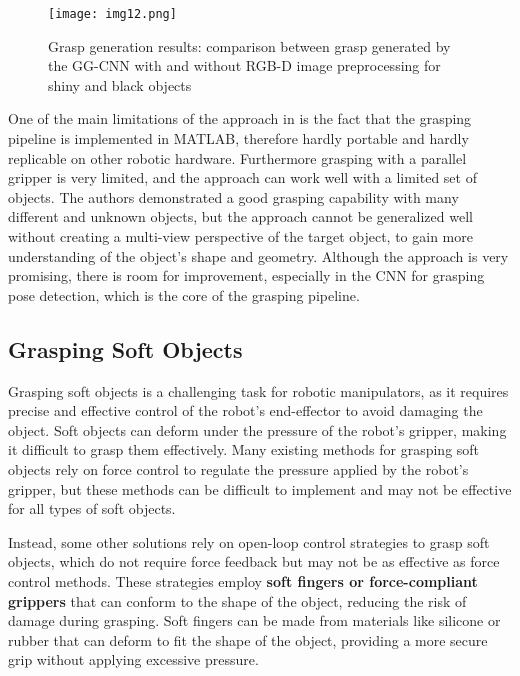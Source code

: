 \begin{figure}[t]
	\centering
	\texttt{[image: img12.png]}
	\captionsetup{width=1\linewidth}
	\caption{Grasp generation results: comparison between grasp generated by the GG-CNN
		with and without RGB-D image preprocessing for shiny and black objects
		\cite{sayour2022unknowngrasping}}
	\label{fig:img12}
\end{figure}

One of the main limitations of the approach in \cite{sayour2022unknowngrasping} is the fact
that the grasping pipeline is implemented in MATLAB, therefore hardly portable and hardly
replicable on other robotic hardware. Furthermore grasping with a parallel gripper is
very limited, and the approach can work well with a limited set of objects. The authors
demonstrated a good grasping capability with many different and unknown objects, but
the approach cannot be generalized well without creating a multi-view perspective of
the target object, to gain more understanding of the object's shape and
geometry. Although the approach is very promising, there is room for improvement,
especially in the CNN for grasping pose detection, which is the core of the grasping pipeline.


\subsection{Grasping Soft Objects}

Grasping soft objects is a challenging task for robotic manipulators, as it requires
precise and effective control of the robot's end-effector to avoid damaging the object.
Soft objects can deform under the pressure of the robot's gripper, making it difficult
to grasp them effectively. Many existing methods for grasping soft objects rely on
force control to regulate the pressure applied by the robot's gripper, but these methods
can be difficult to implement and may not be effective for all types of soft objects.

Instead, some other solutions rely on open-loop control strategies to grasp soft objects,
which do not require force feedback but may not be as effective as force control methods.
These strategies employ \textbf{soft fingers or force-compliant grippers} that can conform to the shape
of the object, reducing the risk of damage during grasping. Soft fingers can be made
from materials like silicone or rubber that can deform to fit the shape of the object,
providing a more secure grip without applying excessive pressure.


